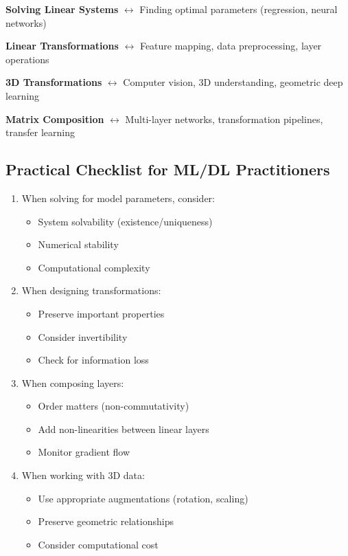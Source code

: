 \documentclass[12pt,a4paper]{article}
\theoremstyle{definition}
\begin{document}
\begin{tcolorbox}[enhanced,breakable,colback=green!10!white,colframe=green!50!black,title=Unified View]
\textbf{Solving Linear Systems} $\leftrightarrow$ Finding optimal parameters (regression, neural networks)

\textbf{Linear Transformations} $\leftrightarrow$ Feature mapping, data preprocessing, layer operations

\textbf{3D Transformations} $\leftrightarrow$ Computer vision, 3D understanding, geometric deep learning

\textbf{Matrix Composition} $\leftrightarrow$ Multi-layer networks, transformation pipelines, transfer learning
\end{tcolorbox}

\subsection{Practical Checklist for ML/DL Practitioners}

\begin{enumerate}
\item When solving for model parameters, consider:
\begin{itemize}
\item System solvability (existence/uniqueness)
\item Numerical stability
\item Computational complexity
\end{itemize}

\item When designing transformations:
\begin{itemize}
\item Preserve important properties
\item Consider invertibility
\item Check for information loss
\end{itemize}

\item When composing layers:
\begin{itemize}
\item Order matters (non-commutativity)
\item Add non-linearities between linear layers
\item Monitor gradient flow
\end{itemize}

\item When working with 3D data:
\begin{itemize}
\item Use appropriate augmentations (rotation, scaling)
\item Preserve geometric relationships
\item Consider computational cost
\end{itemize}
\end{enumerate}
\end{document}
